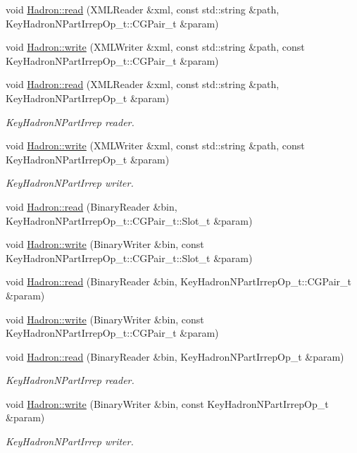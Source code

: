 \begin{DoxyCompactItemize}
\item 
void \mbox{\hyperlink{namespaceHadron_a7d8926bf48de7c75f93c8ffc8b6bab3e}{Hadron\+::read}} (X\+M\+L\+Reader \&xml, const std\+::string \&path, Key\+Hadron\+N\+Part\+Irrep\+Op\+\_\+t\+::\+C\+G\+Pair\+\_\+t \&param)
\item 
void \mbox{\hyperlink{namespaceHadron_ad194604b0eb61ca7e7ffa89d1ef4c879}{Hadron\+::write}} (X\+M\+L\+Writer \&xml, const std\+::string \&path, const Key\+Hadron\+N\+Part\+Irrep\+Op\+\_\+t\+::\+C\+G\+Pair\+\_\+t \&param)
\item 
void \mbox{\hyperlink{namespaceHadron_ac345c2bc828c82e6774e6bc01e57535e}{Hadron\+::read}} (X\+M\+L\+Reader \&xml, const std\+::string \&path, Key\+Hadron\+N\+Part\+Irrep\+Op\+\_\+t \&param)
\begin{DoxyCompactList}\small\item\em Key\+Hadron\+N\+Part\+Irrep reader. \end{DoxyCompactList}\item 
void \mbox{\hyperlink{namespaceHadron_a6789ce2b1b787b1f3136c9a2836448a1}{Hadron\+::write}} (X\+M\+L\+Writer \&xml, const std\+::string \&path, const Key\+Hadron\+N\+Part\+Irrep\+Op\+\_\+t \&param)
\begin{DoxyCompactList}\small\item\em Key\+Hadron\+N\+Part\+Irrep writer. \end{DoxyCompactList}\item 
void \mbox{\hyperlink{namespaceHadron_ae19da1a7e40c864440841a389b468c8d}{Hadron\+::read}} (Binary\+Reader \&bin, Key\+Hadron\+N\+Part\+Irrep\+Op\+\_\+t\+::\+C\+G\+Pair\+\_\+t\+::\+Slot\+\_\+t \&param)
\item 
void \mbox{\hyperlink{namespaceHadron_a4beaf6ce4a67fc85ae046f257141250e}{Hadron\+::write}} (Binary\+Writer \&bin, const Key\+Hadron\+N\+Part\+Irrep\+Op\+\_\+t\+::\+C\+G\+Pair\+\_\+t\+::\+Slot\+\_\+t \&param)
\item 
void \mbox{\hyperlink{namespaceHadron_a0567f3fb8f2db68b0a93251138c13a62}{Hadron\+::read}} (Binary\+Reader \&bin, Key\+Hadron\+N\+Part\+Irrep\+Op\+\_\+t\+::\+C\+G\+Pair\+\_\+t \&param)
\item 
void \mbox{\hyperlink{namespaceHadron_aa05ac649ec39cb98483ab55274129758}{Hadron\+::write}} (Binary\+Writer \&bin, const Key\+Hadron\+N\+Part\+Irrep\+Op\+\_\+t\+::\+C\+G\+Pair\+\_\+t \&param)
\item 
void \mbox{\hyperlink{namespaceHadron_a205a666e574892fd5fc22e723a24399e}{Hadron\+::read}} (Binary\+Reader \&bin, Key\+Hadron\+N\+Part\+Irrep\+Op\+\_\+t \&param)
\begin{DoxyCompactList}\small\item\em Key\+Hadron\+N\+Part\+Irrep reader. \end{DoxyCompactList}\item 
void \mbox{\hyperlink{namespaceHadron_aa056cb1973613af20ddde740db299944}{Hadron\+::write}} (Binary\+Writer \&bin, const Key\+Hadron\+N\+Part\+Irrep\+Op\+\_\+t \&param)
\begin{DoxyCompactList}\small\item\em Key\+Hadron\+N\+Part\+Irrep writer. \end{DoxyCompactList}\end{DoxyCompactItemize}



